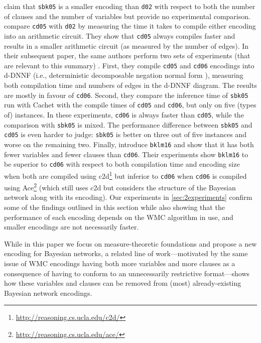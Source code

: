 \citet{DBLP:conf/aaai/SangBK05} claim that
\texttt{sbk05} is a smaller encoding than \texttt{d02} with respect to both the
number of clauses and the number of variables but provide no experimental
comparison. \citet{DBLP:conf/ijcai/ChaviraD05} compare \texttt{cd05} with
\texttt{d02} by measuring the time it takes to compile either encoding into an
arithmetic circuit. They show that
\texttt{cd05} always compiles faster and results in a smaller arithmetic circuit
(as measured by the number of edges). In their subsequent paper, the same
authors perform two sets of experiments (that are relevant to this summary)
\citep{DBLP:conf/sat/ChaviraD06}. First, they compile \texttt{cd05} and
\texttt{cd06} encodings into d-DNNF (i.e., deterministic decomposable negation
normal form \citep{DBLP:journals/jancl/Darwiche01}), measuring both compilation
time and numbers of edges in the d-DNNF diagram. The results are mostly in
favour of \texttt{cd06}. Second, they compare the inference time of
\texttt{sbk05} run with \textsf{Cachet} \citep{DBLP:conf/sat/SangBBKP04} with
the compile times of \texttt{cd05} and \texttt{cd06}, but only on five (types
of) instances. In these experiments, \texttt{cd06} is always faster than
\texttt{cd05}, while the comparison with \texttt{sbk05} is mixed.  The
performance difference between \texttt{sbk05} and \texttt{cd05} is even harder
to judge: \texttt{sbk05} is better on three out of five instances and worse on
the remaining two. Finally, \citet{DBLP:conf/ecai/BartKLM16} introduce
\texttt{bklm16} and show that it has both fewer variables and fewer clauses than
\texttt{cd06}. Their experiments show \texttt{bklm16} to be superior to
\texttt{cd06} with respect to both compilation time and encoding size when both
are compiled using
\textsf{c2d}\footnote{\url{http://reasoning.cs.ucla.edu/c2d/}}
\citep{DBLP:conf/ecai/Darwiche04} but inferior to \texttt{cd06} when
\texttt{cd06} is compiled using
\textsf{Ace}\footnote{\url{http://reasoning.cs.ucla.edu/ace/}} (which still uses
\textsf{c2d} but considers the structure of the Bayesian network along with its
encoding). Our experiments in \cref{sec:2experiments} confirm some of the
findings outlined in this section while also showing that the performance of
each encoding depends on the WMC algorithm in use, and smaller encodings are not
necessarily faster.

While in this paper we focus on measure-theoretic foundations and propose a new encoding for Bayesian networks, a related line of work---motivated by the same issue of WMC encodings having both more variables and more clauses as a consequence of having to conform to an unnecessarily restrictive format---shows how these variables and clauses can be removed from (most) already-existing Bayesian network encodings.

